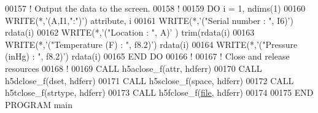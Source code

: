 \begin{DoxyCode}
00157   \textcolor{comment}{! Output the data to the screen.}
00158   \textcolor{comment}{!}
00159   \textcolor{keywordflow}{DO} i = 1, ndims(1)
00160      \textcolor{keyword}{WRITE}(*,\textcolor{stringliteral}{'(A,I1,":")'}) attribute, i
00161      \textcolor{keyword}{WRITE}(*,\textcolor{stringliteral}{'("Serial number   : ", I6)'}) rdata(i)%
00162      \textcolor{keyword}{WRITE}(*,\textcolor{stringliteral}{'("Location        : ", A)'} ) trim(rdata(i)%
00163      \textcolor{keyword}{WRITE}(*,\textcolor{stringliteral}{'("Temperature (F) : ", f8.2)'}) rdata(i)%
00164      \textcolor{keyword}{WRITE}(*,\textcolor{stringliteral}{'("Pressure (inHg) : ", f8.2)'}) rdata(i)%
00165 \textcolor{keywordflow}{  END DO}
00166   \textcolor{comment}{!}
00167   \textcolor{comment}{! Close and release resources}
00168   \textcolor{comment}{!}
00169   \textcolor{keyword}{CALL }h5aclose\_f(attr, hdferr)
00170   \textcolor{keyword}{CALL }h5dclose\_f(dset, hdferr)
00171   \textcolor{keyword}{CALL }h5sclose\_f(space, hdferr)
00172   \textcolor{keyword}{CALL }h5tclose\_f(strtype, hdferr)
00173   \textcolor{keyword}{CALL }h5fclose\_f(\hyperlink{structfile}{file}, hdferr)
00174 
00175 \textcolor{keyword}{END PROGRAM }main
\end{DoxyCode}
